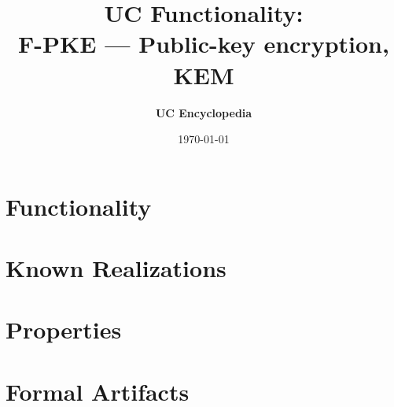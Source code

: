 \documentclass[11pt,a4paper]{article}
\title{\textbf{\Large UC Functionality:}\\[0.2em] \Large F-PKE --- Public-key encryption, KEM}
\author{\textbf{UC Encyclopedia}}
\date{\today}
\newtheorem{functionality}{Functionality}
\begin{document}
\maketitle

\begin{abstract}
\end{abstract}

\section{Functionality}

%

\section{Known Realizations}


\section{Properties}


\section{Formal Artifacts}

\end{document}

